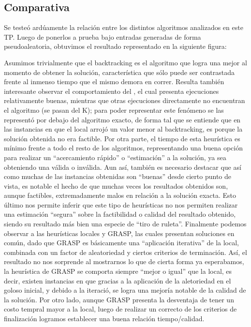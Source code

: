 \documentclass[12pt, a4paper, twoside]{article}
\begin{document}
\begin{TP3}
  \subsection{Comparativa}\label{subsec:comparativa}
  Se testeó ardúamente la relación entre los distintos algoritmos analizados en este TP. Luego de ponerlos a prueba bajo entradas generadas de forma pseudoaleatoria, obtuvimos el resultado representado en la siguiente figura:

  \begin{figure}[H]
    \label{fig:comparativa}
  \end{figure}

  Asumimos trivialmente que el backtracking es el algoritmo que logra una mejor  al momento de obtener la solución, característica que sólo puede ser contrastada frente al inmenso tiempo que el mismo demora en correr. Resulta también interesante observar el comportamiento del , el cual presenta ejecuciones relativamente buenas, mientras que otras ejecuciones directamente no encuentran el algoritmo (se pasan del K); para poder representar este fenómeno se las representó por debajo del algoritmo exacto, de forma tal que se entiende que en las instancias en que el local arrojó un valor menor al backtracking, es porque la solución obtenida no era factible. Por otra parte, el tiempo de esta heurística es mínimo frente a todo el resto de los algoritmos, representando una buena opción para realizar un ``acercamiento rápido'' o ``estimación'' a la solución, ya sea obteniendo una válida o inválida. Aun así, también es necesario destacar que así como muchas de las instancias obtenidas son ``buenas'' desde cierto punto de vista, es notable el hecho de que muchas veces los resultados obtenidos son, aunque factibles, extremadamente malos en relación a la solución exacta. Esto último nos permite inferir que este tipo de heurísticas no nos permiten realizar una estimación ``segura'' sobre la factibilidad o calidad del resultado obtenido, siendo su resultado más bien una especie de ``tiro de ruleta''. Finalmente podemos observar a las heurísticas locales y GRASP, las cuales presentan soluciones en común, dado que GRASP es básicamente una ``aplicación iterativa'' de la local, combinada con un factor de aleatoriedad y ciertos criterios de terminación. Así, el resultado no nos sorprende al mostrarnos lo que de cierta forma ya esperabamos, la heurística de GRASP se comporta siempre ``mejor o igual'' que la local, es decir, existen instancias en que gracias a la aplicación de la aletoriedad en el goloso inicial, y debido a la iteració, se logra una mejoría notable de la calidad de la solución. Por otro lado, aunque GRASP presenta la desventaja de tener un costo tempral mayor a la local, luego de realizar un correcto  de los criterios de finalización logramos establecer una buena relación tiempo/calidad.


\end{TP3}
\end{document}
